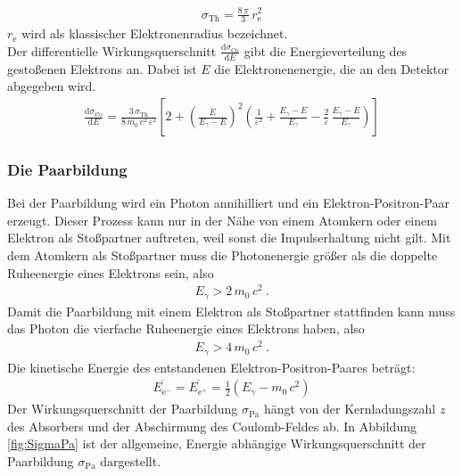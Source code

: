 \begin{align}
	\sigma_\text{Th} = \frac{8\,\pi}{3}\,r_\text{e}^2
\end{align}
$r_\text{e}$ wird als klassischer Elektronenradius bezeichnet. \\
Der differentielle Wirkungsquerschnitt $\frac{\text{d}\sigma_\text{Co}}{\text{d}E}$ gibt die Energieverteilung des gestoßenen Elektrons an. Dabei ist $E$ die Elektronenenergie, die an den Detektor abgegeben wird.
\begin{align}
	\frac{\text{d}\sigma_\text{Co}}{\text{d}E} = \frac{3\,\sigma_\text{Th}}{8\,m_0\,c^2\,\varepsilon^2} \left[2 + \left(\frac{E}{E_\gamma - E} \right)^2 \left(\frac{1}{\varepsilon^2} + \frac{E_\gamma - E}{E_\gamma} - \frac{2}{\varepsilon} \, \frac{E_\gamma - E}{E_\gamma} \right) \right]
\end{align}


\subsubsection{Die Paarbildung}
Bei der Paarbildung wird ein Photon annihilliert und ein Elektron-Positron-Paar erzeugt. Dieser Prozess kann nur in der Nähe von einem Atomkern oder einem Elektron als Stoßpartner auftreten, weil sonst die Impulserhaltung nicht gilt. Mit dem Atomkern als Stoßpartner muss die Photonenergie größer als die doppelte Ruheenergie eines Elektrons sein, also
\begin{align*}
	E_{\gamma} > 2\,m_0\,c^2 \ .
\end{align*}
Damit die Paarbildung mit einem Elektron als Stoßpartner stattfinden kann muss das Photon die vierfache Ruheenergie eines Elektrons haben, also
\begin{align*}
	E_{\gamma} > 4\,m_0\,c^2 \ .
\end{align*}
Die kinetische Energie des entstandenen Elektron-Positron-Paares beträgt:
\begin{align}
	\overline{E_{\text{e}^-}} = \overline{E_{\text{e}^+}} = \frac{1}{2}(E_{\gamma} - m_0\,c^2)
\end{align}
Der Wirkungsquerschnitt der Paarbildung $\sigma_\text{Pa}$ hängt von der Kernladungszahl $z$ des Absorbers und der Abschirmung des Coulomb-Feldes ab. In Abbildung \eqref{fig:SigmaPa} ist der allgemeine, Energie abhängige Wirkungsquerschnitt der Paarbildung $\sigma_\text{Pa}$ dargestellt.

